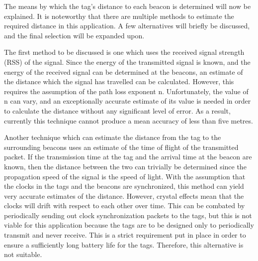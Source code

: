 The means by which the tag's distance to each beacon is determined will now be explained. It is noteworthy that there are multiple methods to estimate the required distance in this application. A few alternatives will briefly be discussed, and the final selection will be expanded upon.

\newpage
{}
The first method to be discussed is one which uses the received signal strength (RSS) of the signal. Since the energy of the transmitted signal is known, and the energy of the received signal can be determined at the beacons, an estimate of the distance which the signal has travelled can be calculated. However, this requires the assumption of the path loss exponent n. Unfortunately, the value of n can vary, and an exceptionally accurate estimate of its value is needed in order to calculate the distance without any significant level of error. As a result, currently this technique cannot produce a mean accuracy of less than five metres.\cite{gaffney}

Another technique which can estimate the distance from the tag to the surrounding beacons uses an estimate of the time of flight of the transmitted packet. If the transmission time at the tag and the arrival time at the beacon are known, then the distance between the two can trivially be determined since the propagation speed of the signal is the speed of light. With the assumption that the clocks in the tags and the beacons are synchronized, this method can yield very accurate estimates of the distance. However, crystal effects mean that the clocks will drift with respect to each other over time.\cite{gaffney} This can be combated by periodically sending out clock synchronization packets to the tags, but this is not viable for this application because the tags are to be designed only to periodically transmit and never receive. This is a strict requirement put in place in order to ensure a sufficiently long battery life for the tags. Therefore, this alternative is not suitable.

